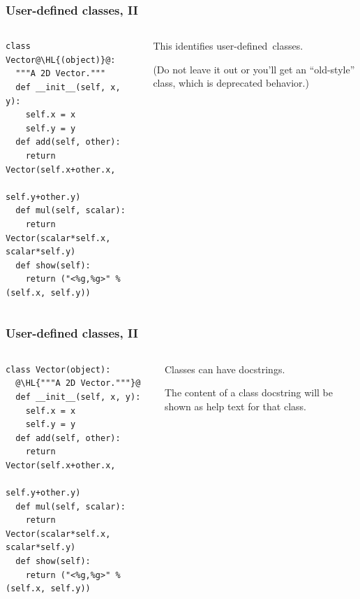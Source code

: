 \documentclass[english,serif,mathserif,xcolor=pdftex,dvipsnames,table]{beamer}
\begin{document}
\begin{frame}[fragile]
  \frametitle{User-defined classes, II}
  \begin{columns}[t]
    \begin{column}{0.5\textwidth}
\begin{lstlisting}
class Vector@\HL{(object)}@:
  """A 2D Vector."""
  def __init__(self, x, y):
    self.x = x
    self.y = y
  def add(self, other):
    return Vector(self.x+other.x,
                  self.y+other.y)
  def mul(self, scalar):
    return Vector(scalar*self.x, scalar*self.y)
  def show(self):
    return ("<%g,%g>" % (self.x, self.y))
\end{lstlisting}
    \end{column}
    \begin{column}{0.5\textwidth}
      \raggedleft
      This identifies user-defined~classes.

      \+
      (Do not leave it out or you'll get an ``old-style'' class, which
      is deprecated behavior.)
    \end{column}
  \end{columns}
\end{frame}


\begin{frame}[fragile]
  \frametitle{User-defined classes, II}
  \begin{columns}[t]
    \begin{column}{0.5\textwidth}
\begin{lstlisting}
class Vector(object):
  @\HL{"""A 2D Vector."""}@
  def __init__(self, x, y):
    self.x = x
    self.y = y
  def add(self, other):
    return Vector(self.x+other.x,
                  self.y+other.y)
  def mul(self, scalar):
    return Vector(scalar*self.x, scalar*self.y)
  def show(self):
    return ("<%g,%g>" % (self.x, self.y))
\end{lstlisting}
    \end{column}
    \begin{column}{0.5\textwidth}
      \raggedleft
      Classes can have docstrings.

      The content of a class docstring will be shown as help text for
      that class.
    \end{column}
  \end{columns}
\end{frame}
\end{document}

